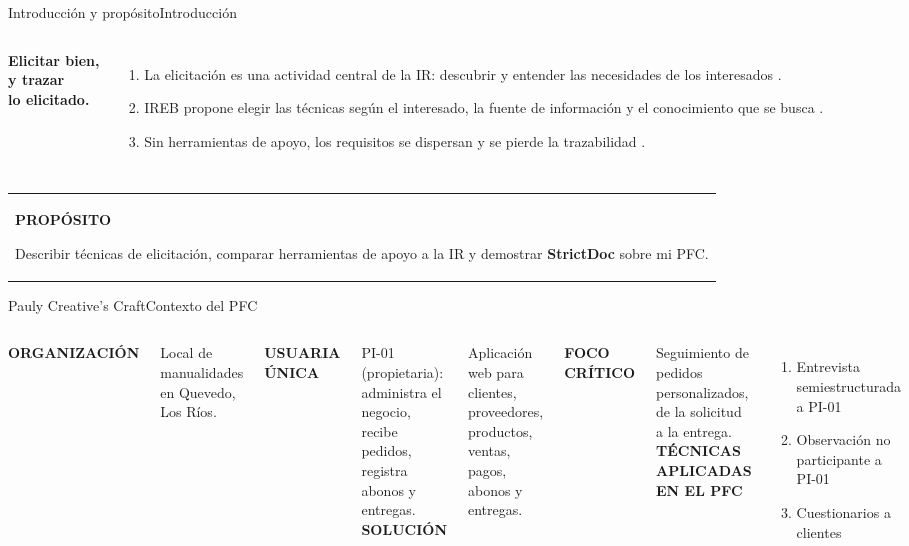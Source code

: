 \documentclass[aspectratio=169,11pt,t]{beamer}
\makeatletter
\newcommand{\etiqueta}[1]{{\color{acento}\scriptsize\bfseries\MakeUppercase{#1}}\par\vspace{3pt}}
\newcommand{\nota}[2]{\par\vspace{3pt}\noindent
	\begin{tabular}{@{}!{\color{acento}\vrule width 2.2pt}@{\hspace{8pt}}p{\dimexpr\linewidth-14pt\relax}@{}}
		{\color{acento}\scriptsize\bfseries\MakeUppercase{#1}}\par\vspace{1pt}#2
	\end{tabular}\par}
\makeatother
\begin{document}
	\begin{frame}{Introducción y propósito}{Introducción}
		\begin{columns}[T]
			\vspace{6pt}
			{\fontsize{22}{26}\selectfont\bfseries Elicitar bien,\\ y \textcolor{acento}{trazar}\\ lo elicitado.\par}
			\small
			\begin{enumerate}
				\item La elicitación es una actividad central de la IR: descubrir y entender las necesidades de los interesados \cite{pacheco2018,ferrari2022}.
				\item IREB propone elegir las técnicas según el interesado, la fuente de información y el conocimiento que se busca \cite{ireb2024}.
				\item Sin herramientas de apoyo, los requisitos se dispersan y se pierde la trazabilidad \cite{mucha2024}.
			\end{enumerate}
		\end{columns}
		\nota{Propósito}{\small Describir técnicas de elicitación, comparar herramientas de apoyo a la IR y demostrar \textbf{StrictDoc} sobre mi PFC.}
	\end{frame}
	
	\begin{frame}{Pauly Creative's Craft}{Contexto del PFC}
		\begin{columns}[T]
			\etiqueta{Organización}\small Local de manualidades en Quevedo, Los Ríos.\par\vspace{8pt}
			\etiqueta{Usuaria única}\small PI-01 (propietaria): administra el negocio, recibe pedidos, registra abonos y entregas.
			\etiqueta{Solución}\small Aplicación web para clientes, proveedores, productos, ventas, pagos, abonos y entregas.\par\vspace{8pt}
			\etiqueta{Foco crítico}\small Seguimiento de pedidos personalizados, de la solicitud a la entrega.
			\etiqueta{Técnicas aplicadas en el PFC}
			\small
			\begin{enumerate}
				\item Entrevista semiestructurada a PI-01
				\item Observación no participante a PI-01
				\item Cuestionarios a clientes
			\end{enumerate}
		\end{columns}
	\end{frame}
	
\end{document}

